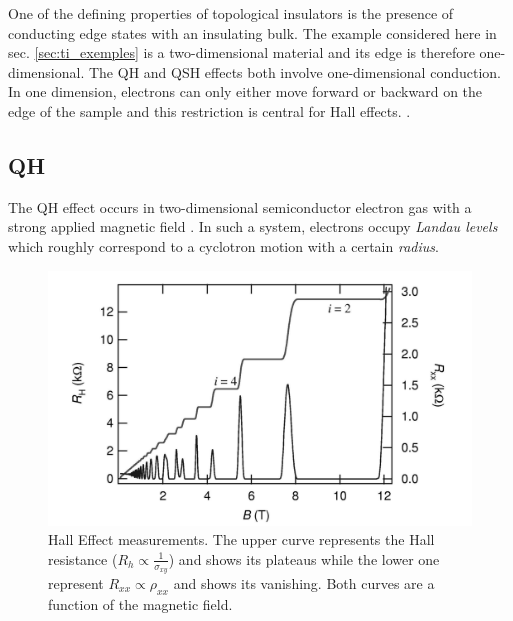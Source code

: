 One of the defining properties of topological insulators is the presence of conducting edge states with an insulating bulk. The example considered here in sec. \ref{sec:ti_exemples} is a two-dimensional material and its edge is therefore one-dimensional. The QH and QSH effects both involve one-dimensional conduction. In one dimension, electrons can only either move forward or backward on the edge of the sample and this restriction is central for Hall effects. \cite{qi_quantum_2010}. 
\subsection{QH}
The QH effect occurs in two-dimensional semiconductor electron gas with a strong applied magnetic field \cite{qi_quantum_2010}. In such a system, electrons occupy \textit{Landau levels} which roughly correspond to a cyclotron motion with a certain \textit{radius}.\cite{laughlin_quantized_1981}

\begin{figure}[h]
    \includegraphics[width=\columnwidth]{sections/visuel/Hall_effect.png}
    \caption{Hall Effect measurements. The upper curve represents the Hall resistance ($R_h \propto \frac{1}{\sigma_{xy}}$) and shows its plateaus while the lower one represent $R_{xx} \propto \rho_{xx}$ and shows its vanishing. Both curves are a function of the magnetic field. \cite{jeckelmann_quantum_nodate}}
    \label{fig:Hall_effet}
\end{figure}

